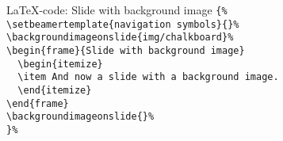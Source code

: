 \documentclass[t,11pt]{beamer}
\begin{document}

\toggleslidecolors
\begin{frame}[fragile]{\LaTeX-code: Slide with background image}
\footnotesize
\verb|{%|\\
\verb|\setbeamertemplate{navigation symbols}{}%|\\
\verb|\backgroundimageonslide{img/chalkboard}%|\\
\verb|\begin{frame}{Slide with background image}|\\
\verb|  \begin{itemize}|\\
\verb|  \item And now a slide with a background image.|\\
\verb|  \end{itemize}|\\
\verb|\end{frame}|\\
\verb|\backgroundimageonslide{}%|\\
\verb|}%|\\
\end{frame}
\toggleslidecolors

{


\backgroundimageonslide{}
}
\end{document}
